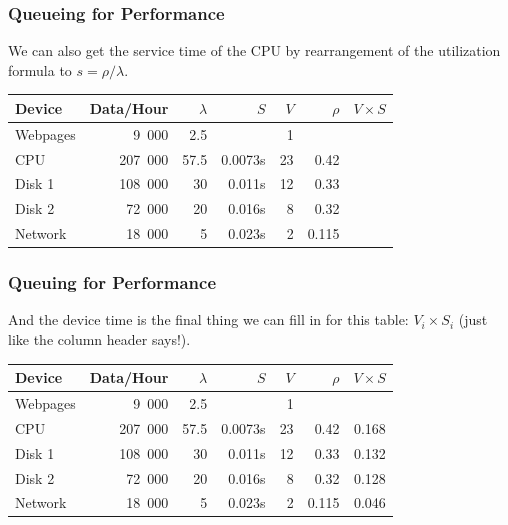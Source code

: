 \begin{frame}
\frametitle{Queueing for Performance}

\begin{changemargin}{1cm}
\large 
We can also get the service time of the CPU by rearrangement of the utilization formula to $s = \rho / \lambda$.
\end{changemargin}

\begin{center}
\begin{tabular}{l|r|r|r|r|r|r} 
	\textbf{Device} & \textbf{Data/Hour} & \textbf{$\lambda$} & \textbf{$S$} & \textbf{$V$} & \textbf{$\rho$} & \textbf{$V \times S$} \\ \hline
	Webpages & 9~000 & 2.5 & & 1 & & \\ \hline
	CPU & 207~000 & 57.5 & 0.0073s & 23 & 0.42 & \\ \hline
	Disk 1 & 108~000 & 30 & 0.011s  & 12& 0.33 &\\ \hline
	Disk 2 & 72~000 & 20 & 0.016s & 8 & 0.32 &\\ \hline
	Network & 18~000 & 5 & 0.023s & 2 & 0.115 &
\end{tabular}
\end{center}

\end{frame}



\begin{frame}
\frametitle{Queuing for Performance}

\begin{changemargin}{1cm}
\large 
And the device time is the final thing we can fill in for this table: $V_{i} \times S_{i}$ (just like the column header says!).
\end{changemargin}

\begin{center}
\begin{tabular}{l|r|r|r|r|r|r} 
	\textbf{Device} & \textbf{Data/Hour} & \textbf{$\lambda$} & \textbf{$S$} & \textbf{$V$} & \textbf{$\rho$} & \textbf{$V \times S$} \\ \hline
	Webpages & 9~000 & 2.5 & & 1 & & \\ \hline
	CPU & 207~000 & 57.5 & 0.0073s & 23 & 0.42 & 0.168\\ \hline
	Disk 1 & 108~000 & 30 & 0.011s  & 12& 0.33 & 0.132\\ \hline
	Disk 2 & 72~000 & 20 & 0.016s & 8 & 0.32 & 0.128\\ \hline
	Network & 18~000 & 5 & 0.023s & 2 & 0.115 & 0.046\\ 
\end{tabular}
\end{center}

\end{frame}



